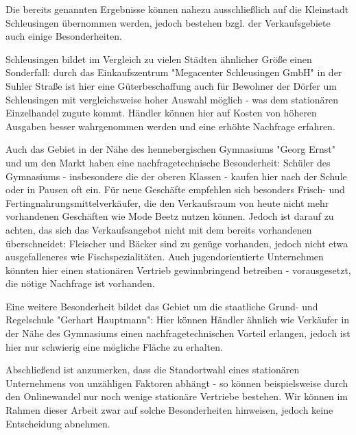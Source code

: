Die bereits genannten Ergebnisse können nahezu ausschließlich auf die Kleinstadt Schleusingen übernommen werden, jedoch bestehen bzgl. der Verkaufsgebiete auch einige Besonderheiten.

Schleusingen bildet im Vergleich zu vielen Städten ähnlicher Größe einen Sonderfall: durch das Einkaufszentrum "Megacenter Schleusingen GmbH" in der Suhler Straße ist hier eine Güterbeschaffung auch für Bewohner der Dörfer um Schleusingen mit vergleichsweise hoher Auswahl möglich - was dem stationären Einzelhandel zugute kommt. Händler können hier auf Kosten von höheren Ausgaben besser wahrgenommen werden und eine erhöhte Nachfrage erfahren. 

Auch das Gebiet in der Nähe des hennebergischen Gymnasiums "Georg Ernst" und um den Markt haben eine nachfragetechnische Besonderheit: Schüler des Gymnasiums - insbesondere die der oberen Klassen - kaufen hier nach der Schule oder in Pausen oft ein. Für neue Geschäfte empfehlen sich besonders Frisch- und Fertingnahrungsmittelverkäufer, die den Verkaufsraum von heute nicht mehr vorhandenen Geschäften wie Mode Beetz nutzen können. Jedoch ist darauf zu achten, das sich das Verkaufsangebot nicht mit dem bereits vorhandenen überschneidet: Fleischer und Bäcker sind zu genüge vorhanden, jedoch nicht etwa ausgefalleneres wie Fischspezialitäten. Auch jugendorientierte Unternehmen könnten hier einen stationären Vertrieb gewinnbringend betreiben - vorausgesetzt, die nötige Nachfrage ist vorhanden.

Eine weitere Besonderheit bildet das Gebiet um die staatliche Grund- und Regelschule "Gerhart Hauptmann": Hier können Händler ähnlich wie Verkäufer in der Nähe des Gymnasiums einen nachfragetechnischen Vorteil erlangen, jedoch ist hier nur schwierig eine mögliche Fläche zu erhalten.

Abschließend ist anzumerken, dass die Standortwahl eines stationären Unternehmens von unzähligen Faktoren abhängt - so können beispielsweise durch den Onlinewandel nur noch wenige stationäre Vertriebe bestehen. Wir können im Rahmen dieser Arbeit zwar auf solche Besonderheiten hinweisen, jedoch keine Entscheidung abnehmen. 


